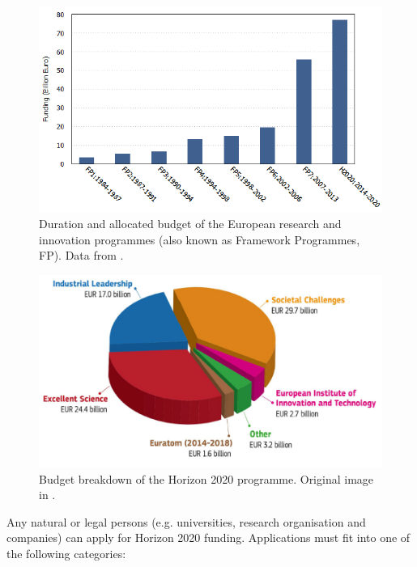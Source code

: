 \begin{figure}[!t] 
 \begin{center}
 \includegraphics[scale=0.4]{Images/FP_funds.png}
 \caption{Duration and allocated budget of the European research and innovation programmes (also known as Framework Programmes, FP). Data from \cite{FPBudget}.}
 \label{FP_funds}
 \end{center}
\end{figure}

\begin{figure}[!t] 
 \begin{center}
 \includegraphics[scale=0.3]{Images/H2020_budget_breakdown.png}
 \caption{Budget breakdown of the Horizon 2020 programme. Original image in \cite{H2020Budget}.}
 \label{H2020_budget_breakdown}
 \end{center}
\end{figure}

Any natural or legal persons (e.g. universities, research organisation and companies) can apply for Horizon 2020 funding. Applications must fit into one of the following categories: 

